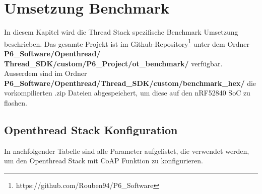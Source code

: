 \clearpage
\section{Umsetzung Benchmark}\label{sec:ThreadUmsetzungBenchmark}
In diesem Kapitel wird die Thread Stack spezifische Benchmark Umsetzung beschrieben. Das gesamte Projekt ist im \href{https://github.com/Rouben94/P6_Software}{Github-Repository\footnote{\url{https://github.com/Rouben94/P6_Software}\cite{github_p6_software_p2p_2020}}} unter dem Ordner \textbf{P6\_Software/Openthread/ Thread\_SDK/custom/P6\_Project/ot\_benchmark/} verfügbar. Ausserdem sind im Ordner \textbf{P6\_Software/Openthread/Thread\_SDK/custom/benchmark\_hex/} die vorkompilierten .zip Dateien abgespeichert, um diese auf den nRF52840 SoC zu flashen. 

\subsection{Openthread Stack Konfiguration}\label{subsec:ThreadStackKonfiguration}
In nachfolgender Tabelle sind alle Parameter aufgelistet, die verwendet werden, um den Openthread Stack mit CoAP Funktion zu konfigurieren.

